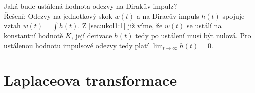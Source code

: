 \documentclass[twoside]{article}
\begin{document}
\subsection{~}
\label{sec:ukol1:3}
Jaká bude ustálená hodnota odezvy na Dirakův impulz? \\
Řešení: Odezvy na jednotkový skok $w(t)$ a na Diracův impuls $h(t)$ spojuje vztah $w(t) = \int h(t)$. Z \ref{sec:ukol1:1} již víme, že $w(t)$ se ustálí
na konstantní hodnotě $K$, její derivace $h(t)$ tedy po ustálení musí být nulová. Pro ustálenou hodnotu impulsové odezvy tedy platí $\lim_{t \to \infty} h(t) = 0$.

\section{Laplaceova transformace}
\label{sec:ukol2}
\end{document}
